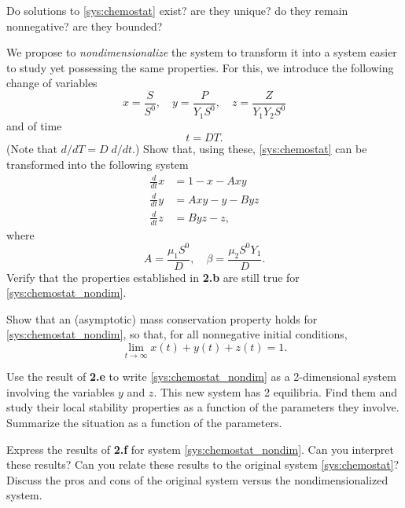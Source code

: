 \documentclass[12pt]{article}
\theoremstyle{plain}
\begin{document}
Do solutions to \eqref{sys:chemostat} exist? are they unique? do they remain nonnegative? are they bounded?

We propose to \emph{nondimensionalize} the system to transform it into a system easier to study yet possessing the same properties. For this, we introduce the following change of variables
\[
x=\frac{S}{S^0},\quad y=\frac{P}{Y_1S^0},\quad z=\frac{Z}{Y_1Y_2S^0}
\]
and of time
\[
t=DT.
\]
(Note that $d/dT=D\; d/dt$.)
Show that, using these, \eqref{sys:chemostat} can be transformed into the following system
\begin{subequations}\label{sys:chemostat_nondim}
\begin{align}
\frac{d}{dt} x &= 1-x-Axy \label{sys:chemostat_nondim_x} \\
\frac{d}{dt} y &= Axy-y-Byz \label{sys:chemostat_nondim_y} \\
\frac{d}{dt} z &= Byz-z, \label{sys:chemostat_nondim_z}
\end{align}
\end{subequations}
where
\[
A=\frac{\mu_1S^0}{D},\quad \beta=\frac{\mu_2S^0Y_1}{D}.
\]
Verify that the properties established in {\bf 2.b} are still true for \eqref{sys:chemostat_nondim}.

Show that an (asymptotic) mass conservation property holds for \eqref{sys:chemostat_nondim}, so that, for all nonnegative initial conditions,
\[
\lim_{t\to\infty} x(t)+y(t)+z(t)=1.
\]

Use the result of {\bf 2.e} to write \eqref{sys:chemostat_nondim} as a 2-dimensional system involving the variables $y$ and $z$. This new system has 2 equilibria. Find them and study their local stability properties as a function of the parameters they involve. Summarize the situation as a function of the parameters.

Express the results of {\bf 2.f} for system \eqref{sys:chemostat_nondim}. Can you interpret these results? Can you relate these results to the original system \eqref{sys:chemostat}? Discuss the pros and cons of the original system versus the nondimensionalized system.
\end{document}
